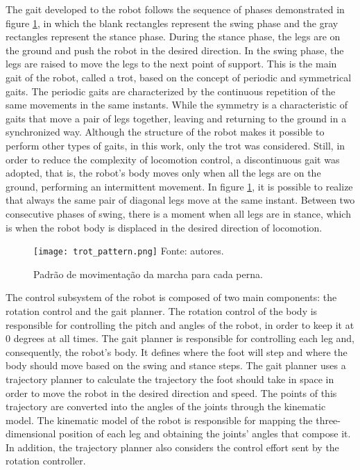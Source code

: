\documentclass[conference]{IEEEtran}
\begin{document}
The gait developed to the robot follows the sequence of phases demonstrated in figure \ref{fig:trot_pattern}, in which the blank rectangles represent the  swing phase and the gray rectangles represent the stance phase. During the stance phase, the legs are on the ground and push the robot in the desired direction.  In the swing phase, the legs are raised to move the legs to the next point of support. This is the main gait of the robot, called a trot, based on the concept of periodic and symmetrical gaits. The periodic gaits are characterized by the continuous repetition of the same movements in the same instants. While the symmetry is a characteristic of gaits that move a pair of legs together, leaving and returning to the ground in a synchronized way. Although the structure of the robot makes it possible to perform other types of gaits, in this work, only the trot was considered. Still,  in order to reduce the complexity of locomotion control, a discontinuous gait was adopted, that is, the robot's body moves only when all the legs are on the ground, performing an intermittent movement. In figure \ref{fig:trot_pattern}, it is possible to realize that always the same pair of diagonal legs move at the same instant. Between two consecutive phases of swing, there is a moment when all legs are in stance, which is when the robot body is displaced in the desired direction of locomotion.

\begin{figure}[!htb]
  \centering
  \caption{Padrão de movimentação da marcha para cada perna.}
  \texttt{[image: trot\_pattern.png]}
  \vfill
  Fonte: autores.
  \label{fig:trot_pattern}
\end{figure}

The control subsystem of the robot is composed of two main components: the rotation control and the gait planner. The rotation control of the body is responsible for controlling the pitch and angles of the robot, in order to keep it at 0 degrees at all times. The gait planner is responsible for controlling each leg and, consequently, the robot's body. It defines where the foot will step and where the body should move based on the swing and stance steps. The gait planner uses a trajectory planner to calculate the trajectory the foot should take in space in order to move the robot in the desired direction and speed. The points of this trajectory are converted into the angles of the joints through the kinematic model. The kinematic model of the robot is responsible for mapping the three-dimensional position of each leg and obtaining the joints' angles that compose it.  In addition, the trajectory planner also considers the control effort sent by the rotation controller.
\end{document}
